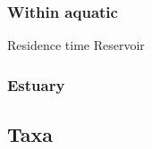 \documentclass[12pt,a4paper]{article} %
\begin{document}
\subsubsection*{Within aquatic}
Residence time
Reservoir

\subsubsection*{Estuary}

\subsection*{Taxa}






\end{document}
